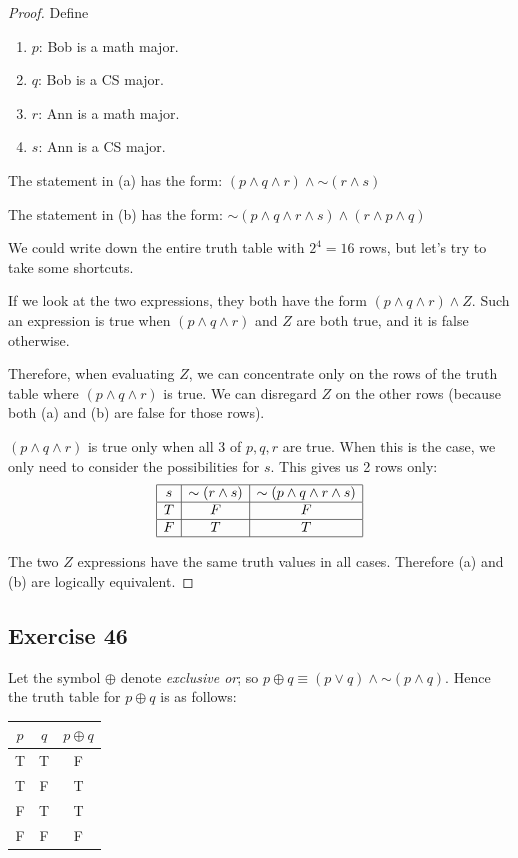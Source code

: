 \documentclass[14pt]{extarticle}
\begin{document}
\begin{proof} Define \begin{enumerate} \item $p$: Bob is a math major. \item
$q$: Bob is a CS major. \item $r$: Ann is a math major. \item $s$: Ann is a CS
major. \end{enumerate}

The statement in (a) has the form: $(p \wedge q \wedge r) \wedge {\sim (r \wedge
s)}$

The statement in (b) has the form: ${\sim (p \wedge q \wedge r \wedge s)} \wedge
(r \wedge p \wedge q)$

We could write down the entire truth table with $2^4 = 16$ rows, but let's try
to take some shortcuts.

If we look at the two expressions, they both have the form $(p \wedge q \wedge
r) \wedge Z$. Such an expression is true when $(p \wedge q \wedge r)$ and $Z$
are both true, and it is false otherwise.

Therefore, when evaluating $Z$, we can concentrate only on the rows of the truth
table where $(p \wedge q \wedge r)$ is true. We can disregard $Z$ on the other
rows (because both (a) and (b) are false for those rows).

$(p \wedge q \wedge r)$ is true only when all 3 of $p, q, r$ are true. When this
is the case, we only need to consider the possibilities for $s$. This gives us 2
rows only: $$ \begin{array}{|c|c|c|} \hline s & {\sim (r \wedge s)} & {\sim (p
\wedge q \wedge r \wedge s)} \\ \hline T & F & F \\ \hline F & T & T \\ \hline
\end{array} $$

The two $Z$ expressions have the same truth values in all cases. Therefore (a)
and (b) are logically equivalent. \end{proof}

\subsection{Exercise 46} Let the symbol $\oplus$ denote {\it exclusive or}; so
$p \oplus q \equiv (p \vee q) \wedge {\sim(p \wedge q)}$. Hence the truth table
for $p \oplus q$ is as follows:

\begin{center} \begin{tabular}{|cc|c|} \hline $p$ & $q$ & $p \oplus q$ \\ \hline
T & T & F \\ \hline T & F & T \\ \hline F & T & T \\ \hline F & F & F \\ \hline
\end{tabular} \end{center}
\end{document}

